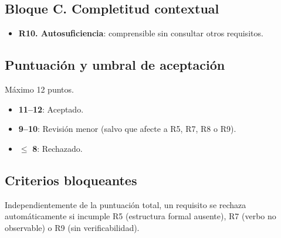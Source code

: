 \subsection*{Bloque C. Completitud contextual}

\begin{itemize}
    \item \textbf{R10. Autosuficiencia}: comprensible sin consultar otros requisitos.
\end{itemize}

\subsection*{Puntuaci\'on y umbral de aceptaci\'on}

M\'aximo 12 puntos.

\begin{itemize}
    \item \textbf{11--12}: Aceptado.
    \item \textbf{9--10}: Revisi\'on menor (salvo que afecte a R5, R7, R8 o R9).
    \item $\leq$ \textbf{8}: Rechazado.
\end{itemize}

\subsection*{Criterios bloqueantes}

Independientemente de la puntuaci\'on total, un requisito se rechaza autom\'aticamente si incumple R5 (estructura formal ausente), R7 (verbo no observable) o R9 (sin verificabilidad).
